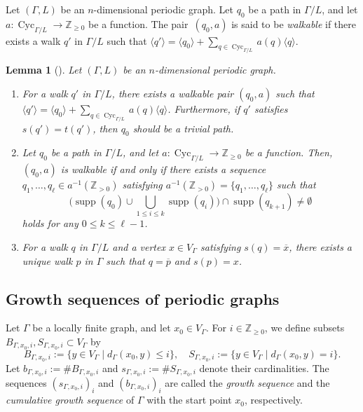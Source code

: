 \documentclass[11pt]{article}
\newtheorem{lem}[theo]{Lemma}
\theoremstyle{definition}
\numberwithin{equation}{section}
\begin{document}
\begin{defn}[{cf.\ \cite[Definition 2.11]{IN}}]
Let $(\Gamma, L)$ be an $n$-dimensional periodic graph. 
Let $q_0$ be a path in $\Gamma /L$, and let $a : \operatorname{Cyc}_{\Gamma /L} \to \mathbb{Z}_{\ge 0}$ be a function. 
The pair~$(q_0, a)$ is said to be \textit{walkable} if there exists a walk $q'$ in $\Gamma / L$ such that 
$\langle q' \rangle = \langle q_0 \rangle + \sum _{q \in \operatorname{Cyc}_{\Gamma /L}} a(q) \langle q \rangle$. 
\end{defn}

\begin{lem}[{\cite[Lemma 2.12, Remark 2.13]{IN}}]\label{lem:bunkai}
Let $(\Gamma, L)$ be an $n$-dimensional periodic graph. 
\begin{enumerate}
\item 
For a walk $q'$ in $\Gamma / L$, there exists a walkable pair $(q_0, a)$ such that 
$\langle q' \rangle = \langle q_0 \rangle + \sum _{q \in \operatorname{Cyc}_{\Gamma /L}} a(q) \langle q \rangle$. 
Furthermore, if $q'$ satisfies $s(q') = t(q')$, then $q_0$ should be a trivial path. 

\item 
Let $q_0$ be a path in $\Gamma /L$, and let $a : \operatorname{Cyc}_{\Gamma /L} \to \mathbb{Z}_{\ge 0}$ be a function. 
Then, $(q_0, a)$ is walkable if and only if 
there exists a sequence $q_1, \ldots , q_{\ell} \in a^{-1}(\mathbb{Z}_{>0})$ satisfying
$a^{-1}(\mathbb{Z}_{>0}) = \{ q_1, \ldots , q_{\ell} \}$ such that 
\[
\biggl( \operatorname{supp}(q_0) \cup \bigcup _{1 \le i \le k} \operatorname{supp}(q_i) \biggr) 
\cap \operatorname{supp}(q_{k+1}) \not = \emptyset
\] 
holds for any $0 \le k \le \ell -1$.

\item
For a walk $q$ in $\Gamma / L$ and a vertex $x \in V_{\Gamma}$ satisfying $s(q) = \overline{x}$, there exists a unique walk $p$ in $\Gamma$ such that $q = \overline{p}$ and $s(p) = x$. 
\end{enumerate}
\end{lem}


\subsection{Growth sequences of periodic graphs}\label{subsection:CS}
Let $\Gamma$ be a locally finite graph, and let $x_0 \in V_{\Gamma}$. 
For $i \in \mathbb{Z}_{\ge 0}$, we define subsets $B_{\Gamma, x_0, i}, S_{\Gamma, x_0,i} \subset V _{\Gamma}$ by
\[
B_{\Gamma, x_0,i} := \{ y \in V _{\Gamma} \mid d_{\Gamma}(x_0, y) \le i \}, \quad
S_{\Gamma, x_0,i} := \{ y \in V _{\Gamma} \mid d_{\Gamma}(x_0, y) = i \}. 
\]
Let $b_{\Gamma, x_0,i} := \# B_{\Gamma, x_0,i}$ and $s_{\Gamma, x_0,i} := \# S_{\Gamma, x_0,i}$ denote their cardinalities. 
The sequences $(s_{\Gamma, x_0,i})_i$ and $(b_{\Gamma, x_0,i})_i$ are called the \textit{growth sequence} and the \textit{cumulative growth sequence} of $\Gamma$ with the start point $x_0$, respectively. 
\end{document}
